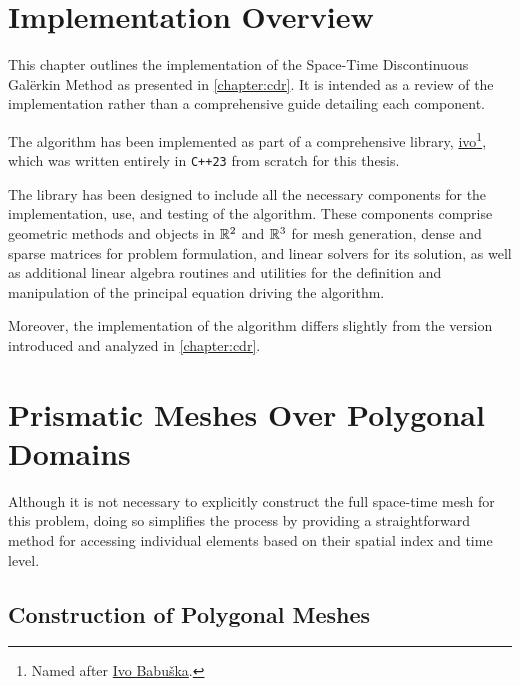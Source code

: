 \section{Implementation Overview}

This chapter outlines the implementation of the Space-Time Discontinuous Galërkin Method as presented in \cref{chapter:cdr}. It is intended as a review of the implementation rather than a comprehensive guide detailing each component.

The algorithm has been implemented as part of a comprehensive library, \href{https://github.com/diantonioandrea/ivo}{ivo}\footnote{Named after \href{https://en.wikipedia.org/wiki/Ivo_Babuška}{Ivo Babuška}.}, which was written entirely in \lstinline{C++23} from scratch for this thesis.

The library has been designed to include all the necessary components for the implementation, use, and testing of the algorithm. These components comprise geometric methods and objects in $\mathbb{R}^{2}$ and $\mathbb{R}^{3}$ for mesh generation, dense and sparse matrices for problem formulation, and linear solvers for its solution, as well as additional linear algebra routines and utilities for the definition and manipulation of the principal equation driving the algorithm.

Moreover, the implementation of the algorithm differs slightly from the version introduced and analyzed in \cref{chapter:cdr}.

\newpage
\section{Prismatic Meshes Over Polygonal Domains} \label{section:mesh}

Although it is not necessary to explicitly construct the full space-time mesh for this problem, doing so simplifies the process by providing a straightforward method for accessing individual elements based on their spatial index and time level. 

\subsection{Construction of Polygonal Meshes} \label{subsection:pol_mesh}

%         
%         

